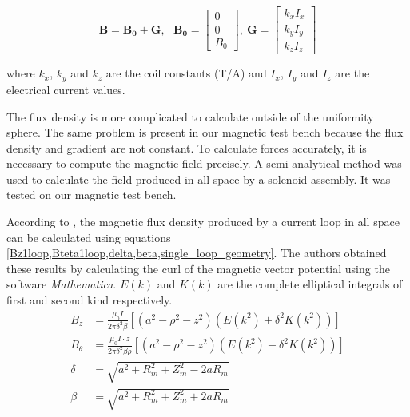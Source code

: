 \documentclass[letterpaper, 10 pt, conference]{ieeeconf}  %
\begin{document}
\begin{equation}
\mathbf{B}=\mathbf{B_0}+\mathbf{G},~~~
\mathbf{B_0}=\begin{bmatrix}
0\\ 
0\\ 
B_0
\end{bmatrix},~
\mathbf{G}=\begin{bmatrix}
k_x I_x\\ 
k_y I_y\\ 
k_z I_z
\end{bmatrix}
\label{magfield}
\end{equation}

where $k_x$, $k_y$ and $k_z$ are the coil constants (T/A) and $I_x$, $I_y$ and $I_z$ are the electrical current values.\par

The flux density is more complicated to calculate outside of the uniformity sphere. The same problem is present in our magnetic test bench because the flux density and gradient are not constant. To calculate forces accurately, it is necessary to compute the magnetic field precisely. A semi-analytical method was used to calculate the field produced in all space by a solenoid assembly. It was tested on our magnetic test bench.\par
According to \cite{simpson2001simple}, the magnetic flux density produced by a current loop in all space can be calculated using equations \cref{Bz1loop,Bteta1loop,delta,beta,single_loop_geometry}. The authors obtained these results by calculating the curl of the magnetic vector potential using the software \textit{Mathematica}.  $E(k)$ and $K(k)$ are the complete elliptical integrals of first and second kind respectively.
\begin{align}
B_z &=\frac{\mu _0I}{2\pi\delta ^{2}\beta  }\left [ \left ( a^2-\rho ^2-z^2 \right )(E(k^2)+\delta ^2K(k^2)) \right ] 
\label{Bz1loop}\\
B_\theta &=\frac{\mu _0 I \cdot z}{2\pi\delta ^{2}\beta\rho   }\left [ \left ( a^2-\rho ^2-z^2 \right )(E(k^2)-\delta ^2K(k^2)) \right ]
\label{Bteta1loop}\\
\delta &=\sqrt{a^2+R_m^2+Z_m^2-2aR_m}
\label{delta}\\
\beta &=\sqrt{a^2+R_m^2+Z_m^2+2aR_m}
\label{beta}
\end{align}
\end{document}
